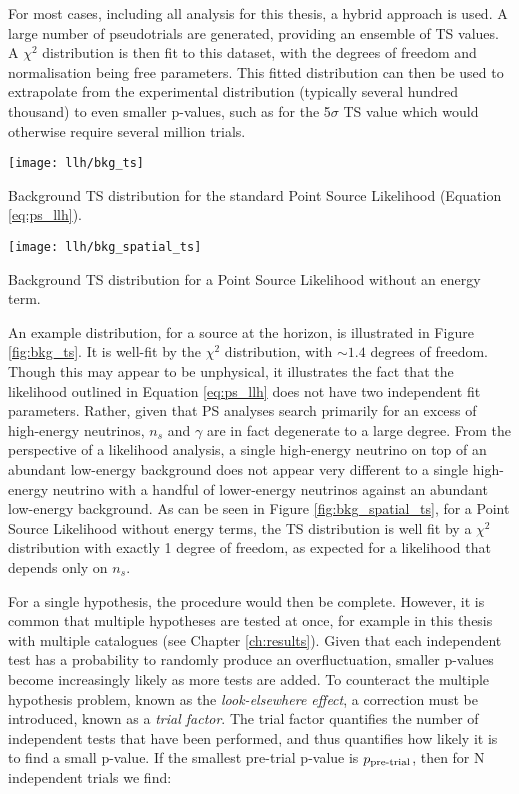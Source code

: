 For most cases, including all analysis for this thesis, a hybrid approach is used. A large number of pseudotrials are generated, providing an ensemble of TS values. A $\chi^{2}$ distribution is then fit to this dataset, with the degrees of freedom and normalisation being free parameters. This fitted distribution can then be used to extrapolate from the experimental distribution (typically several hundred thousand) to even smaller p-values, such as for the 5$\sigma$ TS value which would otherwise require several million trials.

\begin{marginfigure}
	\centering \texttt{[image: llh/bkg\_ts]}
	\caption{Background TS distribution for the standard Point Source Likelihood (Equation \ref{eq:ps_llh}).}
	\label{fig:bkg_ts}
\end{marginfigure}

\begin{marginfigure}
	\centering \texttt{[image: llh/bkg\_spatial\_ts]}
	\caption{Background TS distribution for a Point Source Likelihood without an energy term.}
	\label{fig:bkg_spatial_ts}
\end{marginfigure}

An example distribution, for a source at the horizon, is illustrated in Figure \ref{fig:bkg_ts}. It is well-fit by the $\chi^{2}$ distribution, with $\sim1.4$ degrees of freedom. Though this may appear to be unphysical, it illustrates the fact that the likelihood outlined in Equation \ref{eq:ps_llh} does not have two independent fit parameters. Rather, given that PS analyses search primarily for an excess of high-energy neutrinos, $n_{s}$ and $\gamma$ are in fact degenerate to a large degree. From the perspective of a likelihood analysis, a single high-energy neutrino on top of an abundant low-energy background does not appear very different to a single high-energy neutrino with a handful of lower-energy neutrinos against an abundant low-energy background. As can be seen in Figure \ref{fig:bkg_spatial_ts}, for a Point Source Likelihood without energy terms, the TS distribution is well fit by a $\chi^{2}$ distribution with exactly 1 degree of freedom, as expected for a likelihood that depends only on $n_{s}$.

For a single hypothesis, the procedure would then be complete. However, it is common that multiple hypotheses are tested at once, for example in this thesis with multiple catalogues (see Chapter \ref{ch:results}). Given that each independent test has a probability to randomly produce an overfluctuation, smaller p-values become increasingly likely as more tests are added. To counteract the multiple hypothesis problem, known as the \emph{look-elsewhere effect}, a correction must be introduced, known as a \emph{trial factor}. The trial factor quantifies the number of independent tests that have been performed, and thus quantifies how likely it is to find a small p-value. If the smallest pre-trial p-value is $p_{\textup{pre-trial}} $, then for N independent trials we find:

